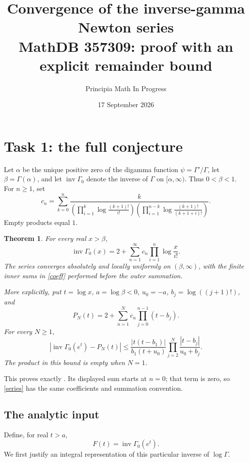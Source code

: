 \documentclass[11pt]{article}
\title{Convergence of the inverse-gamma Newton series\\
\large MathDB 357309: proof with an explicit remainder bound}
\author{Principia Math In Progress}
\date{17 September 2026}
\newtheorem{theorem}{Theorem}
\newcommand{\invGamma}{\operatorname{inv}\Gamma_0}
\begin{document}
\maketitle

\section*{Task 1: the full conjecture}
Let $\alpha$ be the unique positive zero of the digamma function
$\psi=\Gamma'/\Gamma$, let $\beta=\Gamma(\alpha)$, and let
$\invGamma$ denote the inverse of $\Gamma$ on $[\alpha,\infty)$.
Thus $0<\beta<1$. For $n\geq1$, set
\begin{equation}\label{coeff}
 c_n=\sum_{k=0}^n
 \frac{k}{
 \displaystyle
 \left(\prod_{i=1}^k\log\frac{(k+1)!}{i!}\right)
 \left(\prod_{i=1}^{n-k}\log\frac{(k+1)!}{(k+1+i)!}\right)}.
\end{equation}
Empty products equal $1$.

\begin{theorem}\label{main}
For every real $x>\beta$,
\begin{equation}\label{series}
 \boxed{\displaystyle
 \invGamma(x)=2+\sum_{n=1}^\infty c_n
                    \prod_{i=1}^n\log\frac{x}{i!}.}
\end{equation}
The series converges absolutely and locally uniformly on
$(\beta,\infty)$, with the finite inner sums in \eqref{coeff}
performed before the outer summation.

More explicitly, put $t=\log x$, $a=\log\beta<0$,
$u_0=-a$, $b_j=\log((j+1)!)$, and
\[
 P_N(t)=2+\sum_{n=1}^Nc_n\prod_{j=0}^{n-1}(t-b_j).
\]
For every $N\geq1$,
\begin{equation}\label{bound}
 \left|\invGamma(e^t)-P_N(t)\right|
 \leq
 \frac{|t(t-b_1)|}{b_1(t+u_0)}
       \prod_{j=2}^N\frac{|t-b_j|}{u_0+b_j}.
\end{equation}
The product in this bound is empty when $N=1$.
\end{theorem}

This proves exactly \cite[Conjecture 3.1]{Ulgenes}. Its displayed
sum starts at $n=0$; that term is zero, so \eqref{series} has the
same coefficients and summation convention.

\subsection*{The analytic input}
Define, for real $t>a$,
\[
 F(t)=\invGamma(e^t).
\]
We first justify an integral representation of this particular
inverse of $\log\Gamma$.
\end{document}

